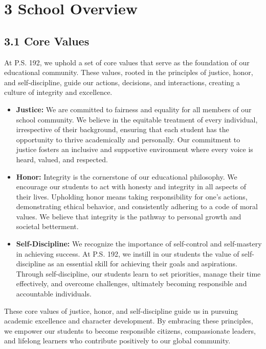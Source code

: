 \documentclass[11pt]{article}
\begin{document}
\section{3 School Overview}
\label{sec:org6bea84f}

\subsection{3.1 Core Values}
\label{sec:orga30c1c6}

At P.S. 192, we uphold a set of core values that serve as the foundation of our educational community. These values, rooted in the principles of justice, honor, and self-discipline, guide our actions, decisions, and interactions, creating a culture of integrity and excellence.

\begin{itemize}
\item \textbf{\textbf{Justice:}} We are committed to fairness and equality for all members of our school community. We believe in the equitable treatment of every individual, irrespective of their background, ensuring that each student has the opportunity to thrive academically and personally. Our commitment to justice fosters an inclusive and supportive environment where every voice is heard, valued, and respected.

\item \textbf{\textbf{Honor:}} Integrity is the cornerstone of our educational philosophy. We encourage our students to act with honesty and integrity in all aspects of their lives. Upholding honor means taking responsibility for one’s actions, demonstrating ethical behavior, and consistently adhering to a code of moral values. We believe that integrity is the pathway to personal growth and societal betterment.

\item \textbf{\textbf{Self-Discipline:}} We recognize the importance of self-control and self-mastery in achieving success. At P.S. 192, we instill in our students the value of self-discipline as an essential skill for achieving their goals and aspirations. Through self-discipline, our students learn to set priorities, manage their time effectively, and overcome challenges, ultimately becoming responsible and accountable individuals.
\end{itemize}

These core values of justice, honor, and self-discipline guide us in pursuing academic excellence and character development. By embracing these principles, we empower our students to become responsible citizens, compassionate leaders, and lifelong learners who contribute positively to our global community.
\end{document}
